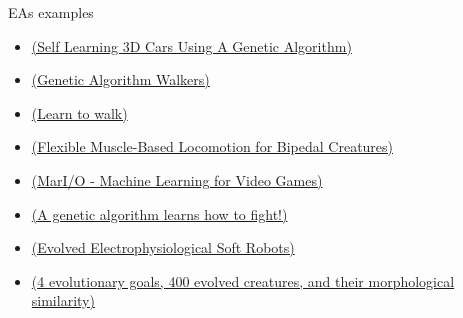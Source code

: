 \documentclass[10pt,compress]{beamer} %
\begin{document}
\begin{frame}{EAs examples}
	\begin{itemize}
		\item \href{http://guillaumebouchetepitech.github.io/geneticAlgorithm_experiment/emscripten/bullet/dist/index.html}{(Self Learning 3D Cars Using A Genetic Algorithm)}
		\item \href{http://rednuht.org/genetic\_walkers/} {(Genetic Algorithm Walkers)}
		\item \href{https://www.youtube.com/watch?v=xcIBoPuNIiw}{(Learn to walk)}
		\item \href{https://www.youtube.com/watch?v=pgaEE27nsQw}{(Flexible Muscle-Based Locomotion for Bipedal Creatures)}
		\item \href{https://www.youtube.com/watch?v=qv6UVOQ0F44}{(MarI/O - Machine Learning for Video Games)}
		\item \href{https://www.youtube.com/watch?v=u2t77mQmJiY}{(A genetic algorithm learns how to fight!)}
		\item \href{https://www.youtube.com/watch?v=HgWQ-gPIvt4}{(Evolved Electrophysiological Soft Robots)}
		\item \href{https://www.youtube.com/watch?v=lo4vL7gOuYk}{(4 evolutionary goals, 400 evolved creatures, and their morphological similarity)}
	\end{itemize}
\end{frame}
\end{document}
